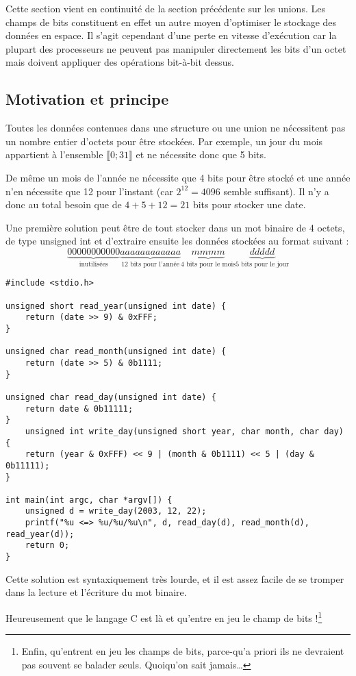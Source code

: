 \documentclass[../../../main.tex]{subfiles}
\begin{document}
Cette section vient en continuité de la section précédente sur les unions. Les champs de bits constituent
en effet un autre moyen d'optimiser le stockage des données en espace. Il s'agit cependant d'une perte
en vitesse d'exécution car la plupart des processeurs ne peuvent pas manipuler directement les bits
d'un octet mais doivent appliquer des opérations bit-à-bit dessus.
\subsection{Motivation et principe}
Toutes les données contenues dans une structure ou une union ne nécessitent pas un nombre entier
d'octets pour être stockées. Par exemple, un jour du mois appartient à l'ensemble $\llbracket 0; 31\rrbracket$ et ne nécessite
donc que 5 bits.

De même un mois de l'année ne nécessite que 4 bits pour être stocké et une année n'en nécessite que
12 pour l'instant (car $2^{12} = 4096$ semble suffisant). Il n'y a donc au total besoin que de $4 + 5 + 12 = 21$ bits pour stocker une date.

Une première solution peut être de tout stocker dans un mot binaire de 4 octets, de type unsigned int
et d'extraire ensuite les données stockées au format suivant :
$$\underbrace{00000000000}_{\text{inutilisées}}\underbrace{aaaaaaaaaaaa}_{\text{12 bits pour l'année}}\underbrace{mmmm}_{\text{4 bits pour le mois}}\underbrace{ddddd}_{\text{5 bits pour le jour}}$$
\begin{verbatim}
#include <stdio.h>

unsigned short read_year(unsigned int date) {
	return (date >> 9) & 0xFFF;
}

unsigned char read_month(unsigned int date) {
	return (date >> 5) & 0b1111;
}

unsigned char read_day(unsigned int date) {
	return date & 0b11111;
}
	unsigned int write_day(unsigned short year, char month, char day) {
	return (year & 0xFFF) << 9 | (month & 0b1111) << 5 | (day & 0b11111);
}

int main(int argc, char *argv[]) {
	unsigned d = write_day(2003, 12, 22);
	printf("%u <=> %u/%u/%u\n", d, read_day(d), read_month(d), read_year(d));
	return 0;
}
\end{verbatim}
Cette solution est syntaxiquement très lourde, et il est assez facile de se tromper dans la lecture et
l'écriture du mot binaire.

Heureusement que le langage C est là et qu'entre en jeu le champ de bits !\footnote{Enfin, qu'entrent en jeu les champs de bits, parce-qu'a priori ils ne devraient pas souvent se balader seuls. Quoiqu'on sait jamais\dots}
\end{document}
